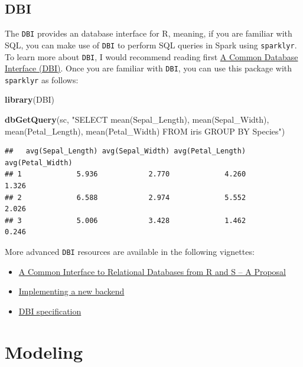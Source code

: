\documentclass[]{book}
\newenvironment{Shaded}{\begin{snugshade}}{\end{snugshade}}
\newcommand{\KeywordTok}[1]{\textcolor[rgb]{0.13,0.29,0.53}{\textbf{#1}}}
\newcommand{\NormalTok}[1]{#1}
\newcommand{\StringTok}[1]{\textcolor[rgb]{0.31,0.60,0.02}{#1}}
\providecommand{\tightlist}{%
  \setlength{\itemsep}{0pt}\setlength{\parskip}{0pt}}
\theoremstyle{definition}
\theoremstyle{definition}
\theoremstyle{definition}
\theoremstyle{remark}
\begin{document}
\hypertarget{dbi}{%
\section{DBI}\label{dbi}}

The \texttt{DBI} provides an database interface for R, meaning, if you
are familiar with SQL, you can make use of \texttt{DBI} to perform SQL
queries in Spark using \texttt{sparklyr}. To learn more about
\texttt{DBI}, I would recommend reading first
\href{https://cran.r-project.org/web/packages/DBI/vignettes/DBI-1.html}{A
Common Database Interface (DBI)}. Once you are familiar with
\texttt{DBI}, you can use this package with \texttt{sparklyr} as
follows:

\begin{Shaded}
\begin{Highlighting}[]
\KeywordTok{library}\NormalTok{(DBI)}

\KeywordTok{dbGetQuery}\NormalTok{(sc,}
  \StringTok{"SELECT mean(Sepal_Length), mean(Sepal_Width), }
\StringTok{          mean(Petal_Length), mean(Petal_Width)}
\StringTok{   FROM iris}
\StringTok{   GROUP BY Species"}\NormalTok{)}
\end{Highlighting}
\end{Shaded}

\begin{verbatim}
##   avg(Sepal_Length) avg(Sepal_Width) avg(Petal_Length) avg(Petal_Width)
## 1             5.936            2.770             4.260            1.326
## 2             6.588            2.974             5.552            2.026
## 3             5.006            3.428             1.462            0.246
\end{verbatim}

More advanced \texttt{DBI} resources are available in the following
vignettes:

\begin{itemize}
\tightlist
\item
  \href{https://cran.r-project.org/web/packages/DBI/vignettes/DBI-proposal.html}{A
  Common Interface to Relational Databases from R and S -- A Proposal}
\item
  \href{https://cran.r-project.org/web/packages/DBI/vignettes/backend.html}{Implementing
  a new backend}
\item
  \href{https://cran.r-project.org/web/packages/DBI/vignettes/spec.html}{DBI
  specification}
\end{itemize}

\hypertarget{modeling}{%
\chapter{Modeling}\label{modeling}}
\end{document}
